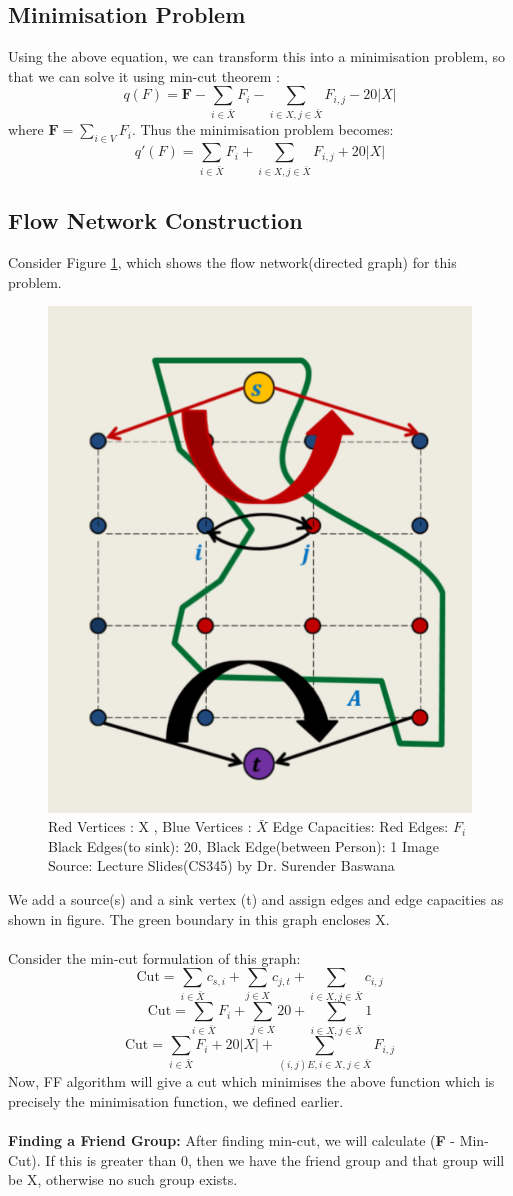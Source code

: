 \documentclass{article}
\begin{document}
\subsection{Minimisation Problem}
Using the above equation, we can transform this into a minimisation problem, so that we can solve it using min-cut theorem :
$$ q(F) =  \textbf{F} - \sum_{i \in \bar{X}}F_i -  \sum_{i \in X, j \in \bar{X}}F_{i,j} - 20|X| $$
where $\textbf{F} = \sum_{i \in V}F_i$. Thus the minimisation problem becomes:
$$ q'(F) =  \sum_{i \in \bar{X}}F_i +  \sum_{i \in X, j \in \bar{X}}F_{i,j} + 20|X| $$
\subsection{Flow Network Construction}
Consider Figure \ref{min}, which shows the flow network(directed graph) for this problem.
\begin{figure}[h!]
\centering
\includegraphics[width=0.5\columnwidth]{fig_minCut.png}
\caption{ Red Vertices : X , Blue Vertices : $\bar{X}$ \newline Edge Capacities: Red Edges: $F_i$ Black Edges(to sink): 20, Black Edge(between Person): 1 \newline Image Source: Lecture Slides(CS345) by Dr. Surender Baswana}
\label{min}
\end{figure}
\newline
We add a source(s) and a sink vertex (t) and assign edges and edge capacities as shown in figure. The green boundary in this graph encloses X. \\ \\
Consider the min-cut formulation of this graph:
$$ \text{Cut} = \sum_{i \in \bar{X}}c_{s,i} + \sum_{j \in X}c_{j,t} + \sum_{i \in X , j \in \bar{X}}c_{i,j}$$
$$ \text{Cut} = \sum_{i \in \bar{X}}F_i + \sum_{j \in X}20 + \sum_{i \in X , j \in \bar{X}}1$$
$$ \text{Cut} = \sum_{i \in \bar{X}}F_i +20|X| + \sum_{(i,j) E , i \in X, j \in \bar{X}}F_{i,j}$$
Now, FF algorithm will give a cut which minimises the above function which is precisely the minimisation function, we defined earlier.\\ \\
\textbf{Finding a Friend Group:} After finding min-cut, we will calculate (\textbf{F} - Min-Cut). If this is greater than 0, then we have the friend group and that group will be X, otherwise no such group exists.
\end{document}
